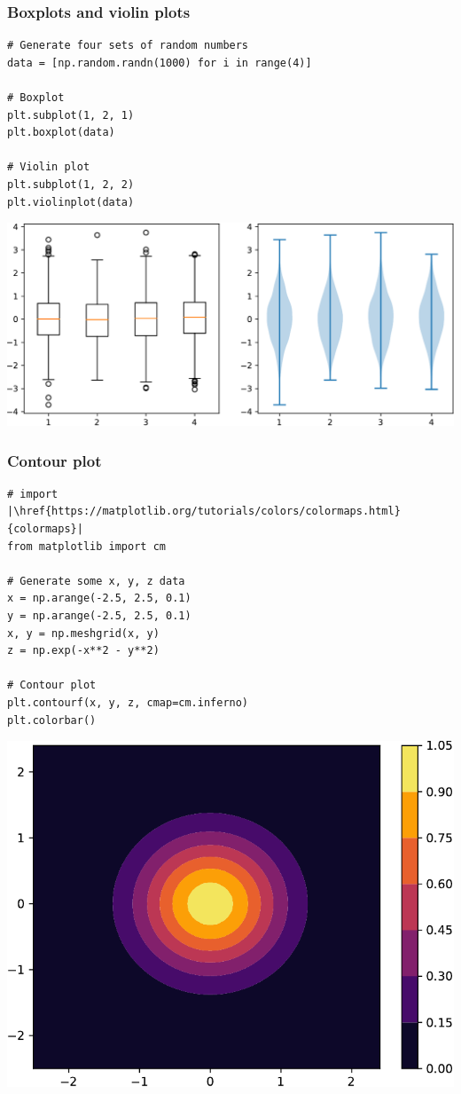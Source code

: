 \documentclass[xcolor=table]{beamer}
\begin{document}
\begin{frame}[fragile]
\frametitle{Boxplots and violin plots}

\begin{lstlisting}[style=python]
# Generate four sets of random numbers
data = [np.random.randn(1000) for i in range(4)]

# Boxplot
plt.subplot(1, 2, 1)
plt.boxplot(data)

# Violin plot
plt.subplot(1, 2, 2)
plt.violinplot(data)
\end{lstlisting}

\vspace{-0.6cm}
\begin{center}
	\includegraphics[width=.72\textwidth]{plot4.pdf}
\end{center}

\end{frame}

\begin{frame}[fragile]
\frametitle{Contour plot}

\tiny
\begin{lstlisting}[style=python]
# import |\href{https://matplotlib.org/tutorials/colors/colormaps.html}{colormaps}|
from matplotlib import cm

# Generate some x, y, z data
x = np.arange(-2.5, 2.5, 0.1)
y = np.arange(-2.5, 2.5, 0.1)
x, y = np.meshgrid(x, y) 
z = np.exp(-x**2 - y**2)

# Contour plot
plt.contourf(x, y, z, cmap=cm.inferno)
plt.colorbar()
\end{lstlisting}

\vspace{-0.8cm}
\begin{center}
	\includegraphics[width=.42\textwidth]{plot5.pdf}
\end{center}

\end{frame}
\end{document}

